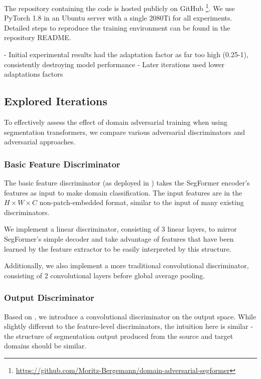 \documentclass[a4paper,12pt]{report}
\begin{document}
The repository containing the code is hosted publicly on GitHub \footnote{\url{https://github.com/Moritz-Bergemann/domain-adversarial-segformer}}. We use PyTorch 1.8 in an Ubuntu server with a single 2080Ti for all experiments. Detailed steps to reproduce the training environment can be found in the repository README.

- Initial experimental results had the adaptation factor as far too high (0.25-1), consistently destroying model performance
- Later iterations used lower adaptations factors
\subsection{Explored Iterations}
To effectively assess the effect of domain adversarial training when using segmentation transformers, we compare various adversarial discriminators and adversarial approaches.

\subsubsection{Basic Feature Discriminator}
The basic feature discriminator (as deployed in \cite{hoffman_fcns_2016}) takes the SegFormer encoder's features as input to make domain classification. The input features are in the $H \times W \times C$ non-patch-embedded format, similar to the input of many existing discriminators.

We implement a linear discriminator, consisting of 3 linear layers, to mirror SegFormer's simple decoder and take advantage of features that have been learned by the feature extractor to be easily interpreted by this structure. 

Additionally, we also implement a more traditional convolutional discriminator, consisting of 2 convolutional layers before global average pooling. %

\subsubsection{Output Discriminator}

Based on \cite{tsai_learning_2020}, we introduce a convolutional discriminator on the output space. While slightly different to the feature-level discriminators, the intuition here is similar - the structure of segmentation output produced from the source and target domains should be similar.
\end{document}
